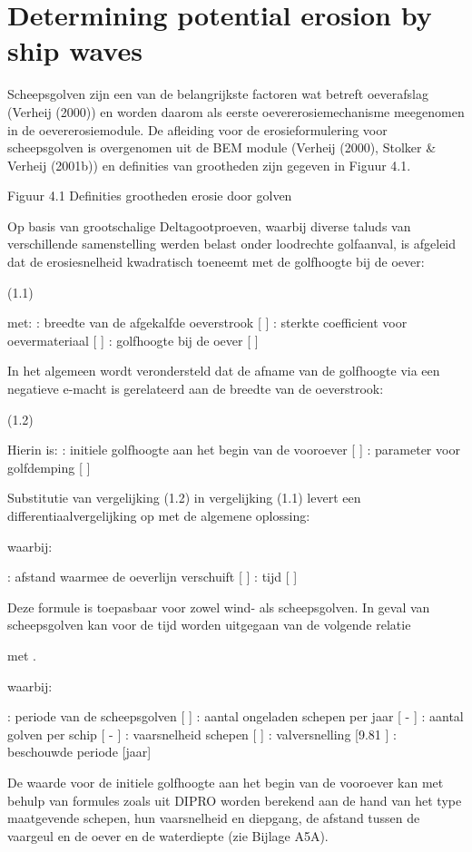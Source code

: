 \section{Determining potential erosion by ship waves}

Scheepsgolven zijn een van de belangrijkste factoren wat betreft oeverafslag (Verheij (2000))  en worden daarom als eerste oevererosiemechanisme meegenomen in de oevererosiemodule.
 De afleiding voor de erosieformulering voor scheepsgolven is overgenomen uit de BEM module (Verheij (2000), Stolker & Verheij (2001b)) en definities van grootheden zijn gegeven in Figuur 4.1.



Figuur 4.1 Definities grootheden erosie door golven


Op basis van grootschalige Deltagootproeven, waarbij diverse taluds van verschillende samenstelling werden belast onder loodrechte golfaanval, is afgeleid dat de erosiesnelheid kwadratisch toeneemt met de golfhoogte bij de oever:

	 	(1.1)

met:
 	: breedte van de afgekalfde oeverstrook [ ]
 	: sterkte coefficient voor oevermateriaal [ ]
 	: golfhoogte bij de oever [ ]

In het algemeen wordt verondersteld dat de afname van de golfhoogte via een negatieve e-macht is gerelateerd aan de breedte van de oeverstrook:

	 	(1.2)

Hierin is:
 	: initiele golfhoogte aan het begin van de vooroever [ ]
 	: parameter voor golfdemping [ ]

Substitutie van vergelijking (1.2) in vergelijking (1.1) levert een differentiaalvergelijking op met de algemene oplossing:
	
waarbij:

 	: afstand waarmee de oeverlijn verschuift [ ]
 	: tijd [ ]

Deze formule is toepasbaar voor zowel wind- als scheepsgolven.
In geval van scheepsgolven kan voor de tijd   worden uitgegaan van de volgende relatie

  met  .

waarbij:

 	: periode van de scheepsgolven [ ]
 	: aantal ongeladen schepen per jaar [ - ]
 	: aantal golven per schip [ - ]
 	: vaarsnelheid schepen [ ]
 	: valversnelling [9.81  ]
  	: beschouwde periode [jaar]

De waarde voor de initiele golfhoogte aan het begin van de vooroever   kan met behulp van formules zoals uit DIPRO worden berekend aan de hand van het type maatgevende schepen, hun vaarsnelheid en diepgang, de afstand tussen de vaargeul en de oever en de waterdiepte (zie Bijlage A5A).

